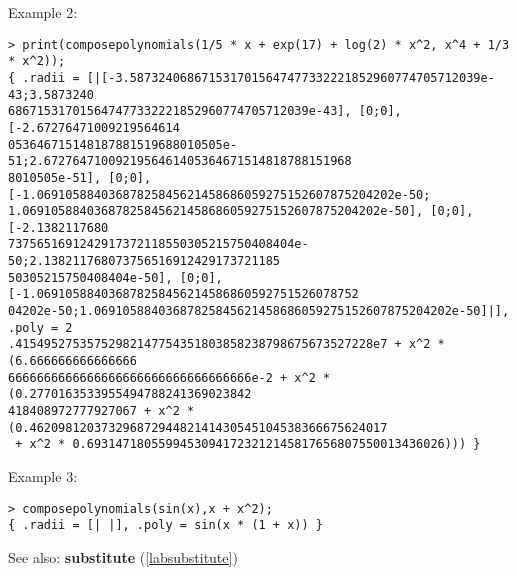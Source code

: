 \noindent Example 2: 
\begin{center}\begin{minipage}{15cm}\begin{Verbatim}[frame=single]
> print(composepolynomials(1/5 * x + exp(17) + log(2) * x^2, x^4 + 1/3 * x^2));
{ .radii = [|[-3.5873240686715317015647477332221852960774705712039e-43;3.5873240
686715317015647477332221852960774705712039e-43], [0;0], [-2.67276471009219564614
053646715148187881519688010505e-51;2.6727647100921956461405364671514818788151968
8010505e-51], [0;0], [-1.06910588403687825845621458686059275152607875204202e-50;
1.06910588403687825845621458686059275152607875204202e-50], [0;0], [-2.1382117680
7375651691242917372118550305215750408404e-50;2.138211768073756516912429173721185
50305215750408404e-50], [0;0], [-1.069105884036878258456214586860592751526078752
04202e-50;1.06910588403687825845621458686059275152607875204202e-50]|], .poly = 2
.41549527535752982147754351803858238798675673527228e7 + x^2 * (6.666666666666666
6666666666666666666666666666666666e-2 + x^2 * (0.2770163533955494788241369023842
418408972777927067 + x^2 * (0.46209812037329687294482141430545104538366675624017
 + x^2 * 0.69314718055994530941723212145817656807550013436026))) }
\end{Verbatim}
\end{minipage}\end{center}
\noindent Example 3: 
\begin{center}\begin{minipage}{15cm}\begin{Verbatim}[frame=single]
> composepolynomials(sin(x),x + x^2);
{ .radii = [| |], .poly = sin(x * (1 + x)) }
\end{Verbatim}
\end{minipage}\end{center}
See also: \textbf{substitute} (\ref{labsubstitute})
